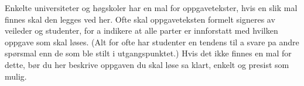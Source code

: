 Enkelte universiteter og høgskoler har en mal for oppgavetekster, hvis en slik mal finnes skal den legges ved her. Ofte skal oppgaveteksten formelt signeres av veileder og studenter, for a indikere at alle parter er innforstatt med hvilken oppgave som skal løses. (Alt for ofte har studenter en tendens til a svare pa andre spørsmal enn de som ble stilt i utgangspunktet.) Hvis det ikke finnes en mal for dette, bør du her beskrive oppgaven du skal løse sa klart, enkelt og presist som mulig.